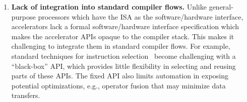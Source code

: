 \begin{enumerate}[label=\textbf{G\arabic{*}}, leftmargin=*]
  \item \textbf{Lack of integration into standard compiler flows.}
  \label{gap.integration}
  Unlike general-purpose processors which have the ISA as the software/hardware interface, accelerators lack a formal software/hardware interface specification which makes the accelerator APIs
  opaque to the compiler stack. This makes it challenging to integrate them %
  in standard compiler flows. 
  For example, standard techniques for instruction selection~\cite{blindell2016instruction} 
  become challenging with a ``black-box'' API,  
  which provides little flexibility in selecting and reusing parts of these APIs.
  The fixed API also limits automation in exposing potential optimizations, e.g., operator fusion that may minimize data transfers.



\end{enumerate}
